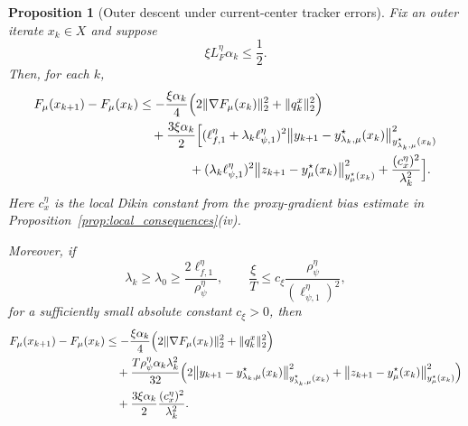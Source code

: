 \documentclass{article}
\newtheorem{proposition}{Proposition}
\begin{document}
\begin{proposition}[Outer descent under current-center tracker errors]
\label{prop:outer_descent}
Fix an outer iterate \(x_k\in X\) and suppose
\begin{equation}
\label{eq:outer_smooth_stepsize}
\xi L_F^\eta\alpha_k\le \frac12 .
\end{equation}
Then, for each \(k\),
\begin{align}
F_\mu(x_{k+1})-F_\mu(x_k)
&\le
-\frac{\xi\alpha_k}{4}
\Bigl(2\|\nabla F_\mu(x_k)\|_2^2+\|q_k^x\|_2^2\Bigr)
\notag\\
&\quad
+\frac{3\xi\alpha_k}{2}
\Bigl[
(\ell_{f,1}^\eta+\lambda_k\ell_{\psi,1}^\eta)^2
\big\|y_{k+1}-y_{\lambda_k,\mu}^\star(x_k)\big\|_{y_{\lambda_k,\mu}^\star(x_k)}^2
\notag\\
&\qquad\qquad
+(\lambda_k\ell_{\psi,1}^\eta)^2
\big\|z_{k+1}-y_\mu^\star(x_k)\big\|_{y_\mu^\star(x_k)}^2
+\frac{(c_x^\eta)^2}{\lambda_k^2}
\Bigr].
\label{eq:outer_descent_current_center}
\end{align}
Here \(c_x^\eta\) is the local Dikin constant from the proxy-gradient bias estimate in
Proposition~\ref{prop:local_consequences}\textup{(iv)}.

Moreover, if
\begin{equation}
\label{eq:outer_balance_stepsize}
\lambda_k\ge \lambda_0\ge \frac{2\ell_{f,1}^\eta}{\rho_\psi^\eta},
\qquad
\frac{\xi}{T}
\le
c_\xi\frac{\rho_\psi^\eta}{(\ell_{\psi,1}^\eta)^2},
\end{equation}
for a sufficiently small absolute constant \(c_\xi>0\), then
\begin{align}
F_\mu(x_{k+1})-F_\mu(x_k)
&\le
-\frac{\xi\alpha_k}{4}
\Bigl(2\|\nabla F_\mu(x_k)\|_2^2+\|q_k^x\|_2^2\Bigr)
\notag\\
&\quad
+
\frac{T\rho_\psi^\eta\alpha_k\lambda_k^2}{32}
\Bigl(
2\big\|y_{k+1}-y_{\lambda_k,\mu}^\star(x_k)\big\|_{y_{\lambda_k,\mu}^\star(x_k)}^2
+
\big\|z_{k+1}-y_\mu^\star(x_k)\big\|_{y_\mu^\star(x_k)}^2
\Bigr)
\notag\\
&\quad
+
\frac{3\xi\alpha_k}{2}\frac{(c_x^\eta)^2}{\lambda_k^2}.
\label{eq:outer_descent_balanced}
\end{align}
\end{proposition}
\end{document}
